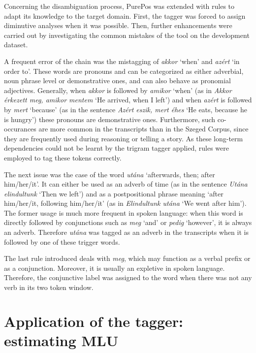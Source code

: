 Concerning the disambiguation process, PurePos was extended with rules to adapt its knowledge to the target domain. 
First, the tagger was forced to assign diminutive analyses when it was possible. 
Then, further enhancements were carried out by investigating the common mistakes of the tool on the development dataset.

A frequent error of the chain was the mistagging of \textit{akkor} `when’ and \textit{azért} `in order to’. 
These words are pronouns and can be categorized as either adverbial, noun phrase level or demonstrative ones, and can also behave as pronomial adjectives. 
Generally, when \textit{akkor} is followed by \textit{amikor} `when’ (as in \textit{Akkor érkezett meg, amikor mentem} `He arrived, when I left’) and when \textit{azért} is followed by \textit{mert} `because’ (as in the sentence \textit{Azért eszik, mert éhes} `He eats, because he is hungry’) these pronouns are demonstrative ones. 
Furthermore, such co-occurances are more common in the transcripts than in the Szeged Corpus, since they are frequently used during reasoning or telling a story. 
As these long-term dependencies could not be learnt by the trigram tagger applied, rules were employed to tag these tokens correctly.

The next issue was the case of the word \textit{utána} `afterwards, then; after him/her/it’. 
It can either be used as an adverb of time (as in the sentence \textit{Utána elindultunk} `Then we left’) and as a postpositional phrase meaning `after him/her/it, following him/her/it’ (as in \textit{Elindultunk utána} `We went after him’). 
The former usage is much more frequent in spoken language: when this word is directly followed by conjunctions such as \textit{meg} `and’ or \textit{pedig} `however’, it is always an adverb. 
Therefore \textit{utána} was tagged as an adverb in the transcripts when it is followed by one of these trigger words. 

The last rule introduced deals with \textit{meg}, which may function as a verbal prefix or as a conjunction.  
Moreover, it is usually an expletive in spoken language.
Therefore, the conjunctive label was assigned to the word when there was not any verb in its two token window.

\section{Application of the tagger: estimating MLU}

